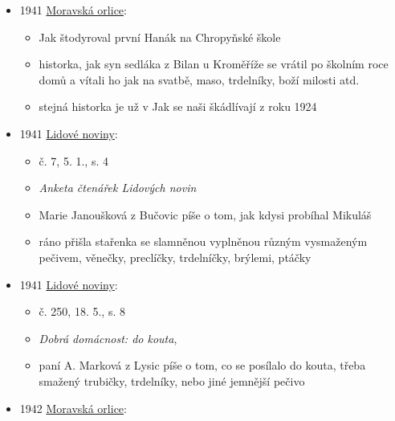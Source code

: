 \begin{itemize}
  \begin{itemize}
  \tightlist
  \item
  \item
    s. 320: kuchyňské výrobky, trdelníky v peci na rožni pečené
  \end{itemize}
\item
  1941
  \href{https://ceskadigitalniknihovna.cz/view/uuid:196e9f80-fea6-11de-bd64-000d606f5dc6?page=uuid:30a645e0-fac8-11de-b0ad-000d606f5dc6&fulltext=trdeln\%C3\%AD*&source=mzk}{Moravská
  orlice}:

  \begin{itemize}
  \tightlist
  \item
    Jak štodyroval první Hanák na Chropyňské škole
  \item
    historka, jak syn sedláka z Bilan u Kroměříže se vrátil po školním
    roce domů a vítali ho jak na svatbě, maso, trdelníky, boží milosti
    atd.
  \item
    stejná historka je už v Jak se naši škádlívají z roku 1924
  \end{itemize}
\item
  1941
  \href{https://www.digitalniknihovna.cz/vkol/uuid/uuid:55f08e40-492c-11dd-ba92-000d606f5dc6}{Lidové
  noviny}:

  \begin{itemize}
  \tightlist
  \item
    č. 7, 5. 1., s. 4
  \item
    \emph{Anketa čtenářek Lidových novin}
  \item
    Marie Janoušková z Bučovic píše o tom, jak kdysi probíhal Mikuláš
  \item
    ráno přišla stařenka se slamněnou vyplněnou různým vysmaženým
    pečivem, věnečky, preclíčky, trdelníčky, brýlemi, ptáčky
  \end{itemize}
\item
  1941
  \href{https://www.digitalniknihovna.cz/vkol/uuid/uuid:e561dc00-6d2b-11dd-80b5-000d606f5dc6}{Lidové
  noviny}:

  \begin{itemize}
  \tightlist
  \item
    č. 250, 18. 5., s. 8
  \item
    \emph{Dobrá domácnost: do kouta},
  \item
    paní A. Marková z Lysic píše o tom, co se posílalo do kouta, třeba
    smažený trubičky, trdelníky, nebo jiné jemnější pečivo
  \end{itemize}
\item
  1942
  \href{https://ceskadigitalniknihovna.cz/view/uuid:a493cef0-fea6-11de-81a7-000d606f5dc6?page=uuid:30eaf000-fac8-11de-9bea-000d606f5dc6&fulltext=trdeln\%C3\%AD*&source=mzk}{Moravská
  orlice}:


\end{itemize}
